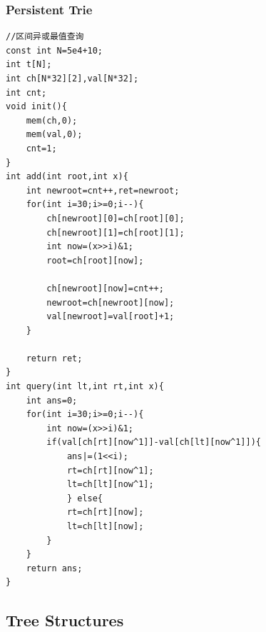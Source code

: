 \documentclass[10pt]{ctexart}
\begin{document}
{\subsubsection{Persistent Trie}
\begin{lstlisting}
//区间异或最值查询
const int N=5e4+10;
int t[N];
int ch[N*32][2],val[N*32];
int cnt;
void init(){
    mem(ch,0);
    mem(val,0);
    cnt=1;
}
int add(int root,int x){
    int newroot=cnt++,ret=newroot;
    for(int i=30;i>=0;i--){
        ch[newroot][0]=ch[root][0];
        ch[newroot][1]=ch[root][1];
        int now=(x>>i)&1;
        root=ch[root][now];

        ch[newroot][now]=cnt++;
        newroot=ch[newroot][now];
        val[newroot]=val[root]+1;
    }

    return ret;
}
int query(int lt,int rt,int x){
    int ans=0;
    for(int i=30;i>=0;i--){
        int now=(x>>i)&1;
        if(val[ch[rt][now^1]]-val[ch[lt][now^1]]){
            ans|=(1<<i);
            rt=ch[rt][now^1];
            lt=ch[lt][now^1];
            } else{
            rt=ch[rt][now];
            lt=ch[lt][now];
        }
    }
    return ans;
}
\end{lstlisting}
\subsection{Tree Structures}
}
\end{document}
